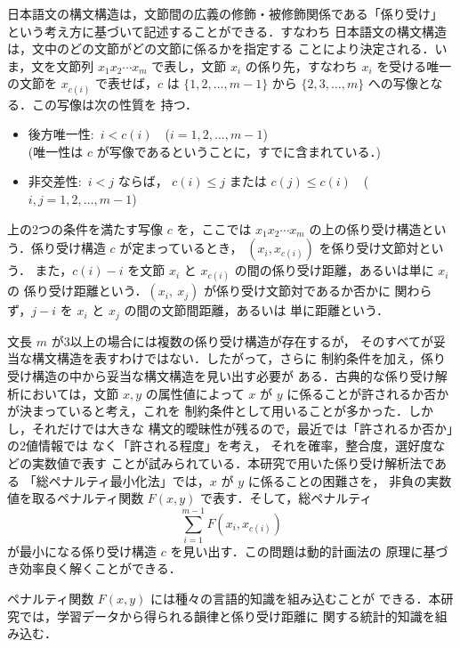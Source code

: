日本語文の構文構造は，文節間の広義の修飾・被修飾関係である「係り受け」
という考え方に基づいて記述することができる\cite{HAS}．すなわち
日本語文の構文構造は，文中のどの文節がどの文節に係るかを指定する
ことにより決定される．いま，文を文節列 $x_{1} x_{2} \cdots x_{m}$ 
で表し，文節 $x_{i}$ の係り先，すなわち $x_{i}$ を受ける唯一の文節を
 $x_{c(i)}$ で表せば，$c$ は $\{1, 2, \ldots , m-1\}$ から
  $\{2, 3, \ldots , m\}$ への写像となる．この写像は次の性質を
持つ\cite{YOS}．
\vspace{5mm}
\begin{itemize}
\item 後方唯一性:\ $i< c(i)$\ \ ($i=1,2,\ldots ,m-1$)\\
(唯一性は $c$ が写像であるということに，すでに含まれている．)
\item 非交差性:\ $i< j$ ならば，
$c(i)\leq j$ または $c(j) \leq c(i)$\ \ ($i, j=1,2,\ldots ,m-1$)
\end{itemize}
\vspace{5mm}
上の2つの条件を満たす写像 $c$ を，ここでは $x_{1} x_{2} \cdots x_{m}$ 
の上の係り受け構造という．係り受け構造 $c$ が定まっているとき，
$(x_{i}, x_{c(i)})$ を係り受け文節対という．
また，$c(i)-i$ を文節 $x_{i}$ と $x_{c(i)}$ 
の間の係り受け距離，あるいは単に $x_{i}$ の
係り受け距離という．$(x_{i},\ x_{j})$ が係り受け文節対であるか否かに
関わらず，$j-i$ を $x_{i}$ と $x_{j}$ の間の文節間距離，あるいは
単に距離という．

文長 $m$ が3以上の場合には複数の係り受け構造が存在するが，
そのすべてが妥当な構文構造を表すわけではない．したがって，さらに
制約条件を加え，係り受け構造の中から妥当な構文構造を見い出す必要が
ある．古典的な係り受け解析においては，文節 $x, y$ の属性値によって
$x$ が $y$ に係ることが許されるか否かが決まっていると考え，これを
制約条件として用いることが多かった．しかし，それだけでは大きな
構文的曖昧性が残るので，最近では「許されるか否か」の2値情報では
なく「許される程度」を考え，
それを確率，整合度，選好度など\cite{FJO,EHA,UTU}の実数値で表す
ことが試みられている．本研究で用いた係り受け解析法である
「総ペナルティ最小化法」では，$x$ が $y$ に係ることの困難さを，
非負の実数値を取るペナルティ関数 $F(x, y)$ で表す．そして，総ペナルティ
\begin{equation}
\sum_{i=1}^{m-1} F(x_{i}, x_{c(i)}) 
\end{equation}
が最小になる係り受け構造 $c$ を見い出す．この問題は動的計画法の
原理に基づき効率良く解くことができる\cite{OZE-1}．

ペナルティ関数 $F(x, y)$ には種々の言語的知識を組み込むことが
できる．本研究では，学習データから得られる韻律と係り受け距離に
関する統計的知識を組み込む．

